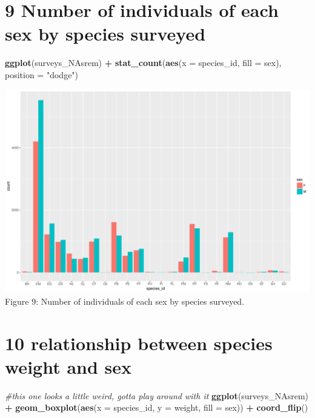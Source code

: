 \documentclass[]{article}
\newenvironment{Shaded}{\begin{snugshade}}{\end{snugshade}}
\newcommand{\KeywordTok}[1]{\textcolor[rgb]{0.13,0.29,0.53}{\textbf{#1}}}
\newcommand{\DataTypeTok}[1]{\textcolor[rgb]{0.13,0.29,0.53}{#1}}
\newcommand{\StringTok}[1]{\textcolor[rgb]{0.31,0.60,0.02}{#1}}
\newcommand{\CommentTok}[1]{\textcolor[rgb]{0.56,0.35,0.01}{\textit{#1}}}
\newcommand{\OperatorTok}[1]{\textcolor[rgb]{0.81,0.36,0.00}{\textbf{#1}}}
\newcommand{\NormalTok}[1]{#1}
\begin{document}
\section{9 Number of individuals of each sex by species
surveyed}\label{number-of-individuals-of-each-sex-by-species-surveyed}

\begin{Shaded}
\begin{Highlighting}[]
\KeywordTok{ggplot}\NormalTok{(surveys_NAsrem) }\OperatorTok{+}\StringTok{ }\KeywordTok{stat_count}\NormalTok{(}\KeywordTok{aes}\NormalTok{(}\DataTypeTok{x =}\NormalTok{ species_id, }\DataTypeTok{fill =}\NormalTok{ sex), }\DataTypeTok{position =} \StringTok{"dodge"}\NormalTok{)}
\end{Highlighting}
\end{Shaded}

\includegraphics{figs/number_individuals_species_sex-1.pdf} Figure 9:
Number of individuals of each sex by species surveyed.

\section{10 relationship between species weight and
sex}\label{relationship-between-species-weight-and-sex}

\begin{Shaded}
\begin{Highlighting}[]
\CommentTok{#this one looks a little weird, gotta play around with it }
\KeywordTok{ggplot}\NormalTok{(surveys_NAsrem) }\OperatorTok{+}\StringTok{ }\KeywordTok{geom_boxplot}\NormalTok{(}\KeywordTok{aes}\NormalTok{(}\DataTypeTok{x =}\NormalTok{ species_id, }\DataTypeTok{y =}\NormalTok{ weight, }\DataTypeTok{fill =}\NormalTok{ sex)) }\OperatorTok{+}
\StringTok{  }\KeywordTok{coord_flip}\NormalTok{()}
\end{Highlighting}
\end{Shaded}
\end{document}

